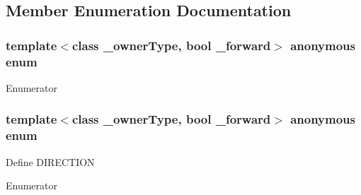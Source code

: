 \subsection{Member Enumeration Documentation}
\hypertarget{classvct_var_stride_n_array_const_iterator_af8a3a7bff8c62645957f37e5f0a2cb26}{\subsubsection[{anonymous enum}]{\setlength{\rightskip}{0pt plus 5cm}template$<$class \-\_\-owner\-Type, bool \-\_\-forward$>$ anonymous enum}}\label{classvct_var_stride_n_array_const_iterator_af8a3a7bff8c62645957f37e5f0a2cb26}
\begin{Desc}
\item[Enumerator]\par
\begin{description}
\item[{\em 
\hypertarget{classvct_var_stride_n_array_const_iterator_af8a3a7bff8c62645957f37e5f0a2cb26a66232514960f77bde765de7883b9c9ad}{D\-I\-M\-E\-N\-S\-I\-O\-N}\label{classvct_var_stride_n_array_const_iterator_af8a3a7bff8c62645957f37e5f0a2cb26a66232514960f77bde765de7883b9c9ad}
}]\end{description}
\end{Desc}
\hypertarget{classvct_var_stride_n_array_const_iterator_af0ff516839367c7e5b697e375001ec43}{\subsubsection[{anonymous enum}]{\setlength{\rightskip}{0pt plus 5cm}template$<$class \-\_\-owner\-Type, bool \-\_\-forward$>$ anonymous enum}}\label{classvct_var_stride_n_array_const_iterator_af0ff516839367c7e5b697e375001ec43}
Define D\-I\-R\-E\-C\-T\-I\-O\-N \begin{Desc}
\item[Enumerator]\par
\begin{description}
\item[{\em 
\hypertarget{classvct_var_stride_n_array_const_iterator_af0ff516839367c7e5b697e375001ec43a12bc9e225c77c3bac1de598aa549843b}{D\-I\-R\-E\-C\-T\-I\-O\-N}\label{classvct_var_stride_n_array_const_iterator_af0ff516839367c7e5b697e375001ec43a12bc9e225c77c3bac1de598aa549843b}
}]\end{description}
\end{Desc}


